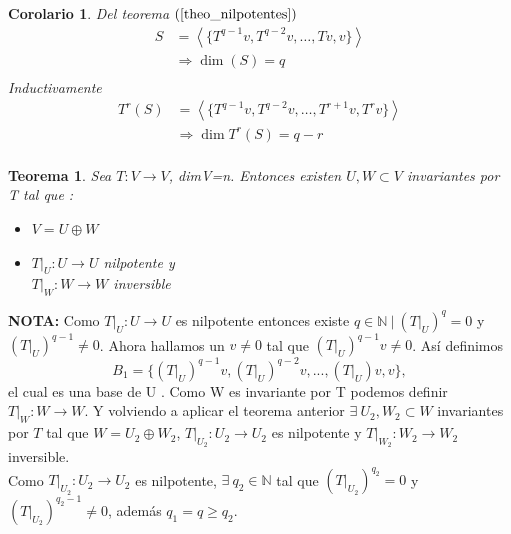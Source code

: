 \documentclass[12pt,a4paper]{article}
\newtheorem{mytheo}{Teorema}[section]
\newtheorem{mycorol}{Corolario}[section]
\begin{document}
\begin{multicols}{2}
	\begin{mycorol}
		Del teorema $(\ref{theo_nilpotentes})$
		\begin{align*}
		S &= \left<\{T^{q-1}v, T^{q-2}v,\ldots,Tv, v\}\right>\\
		&\Rightarrow\dim (S) = q\\			
		\end{align*}
		Inductivamente 
		\begin{align*}
		T^{r}(S) &= \left<\{T^{q-1}v, T^{q-2}v,\ldots,T^{r+1}v, T^{r}v\}\right>\\
		&\Rightarrow\dim T^{r}(S) = q-r\\			
		\end{align*}
	\end{mycorol}
	\begin{mytheo}
		\noindent Sea $T:V\rightarrow V$, dimV=n. Entonces existen $U, W \subset V$ invariantes por T tal que :
		\begin{itemize}
			\item $V=U\oplus W$ 
			\item $T|_{U}:U\rightarrow U$ nilpotente  y\\ $T|_{W}:W\rightarrow W$ inversible
		\end{itemize}
	\end{mytheo}
	\noindent\textbf{NOTA:}
	\noindent Como $T|_{U}:U\rightarrow U$ es nilpotente entonces existe $q\in\mathbb{N} \ | \  \left(T|_{U}\right)^{q}=0 $ y $(T|_{U})^{q-1}\neq 0$. Ahora hallamos un $v\neq0$ tal que $(T|_{U})^{q-1}v\neq 0$. Así definimos 
	$$B_{1}=\{(T|_{U})^{q-1}v, (T|_{U})^{q-2}v, ..., (T|_{U})v,v \},$$ el cual es una base de U . Como W es invariante por T podemos definir $T|_{W}:W\rightarrow W$. Y volviendo a aplicar el teorema anterior $\exists \ U_{2}, W_{2} \subset W$ invariantes por $T$ tal que  $W=U_{2}\oplus W_{2}$,
	$T|_{U_{2}}: U_{2}\rightarrow U_{2}$ es nilpotente y $T|_{W_{2}}:W_{2}\rightarrow W_{2}$ inversible.\\
	Como $T|_{U_{2}}:U_{2}\rightarrow U_{2}$ es nilpotente, $\exists \ q_{2} \in \mathbb{N}$ tal que $ (T|_{U_{2}})^{q_{2}}=0$ y $(T|_{U_{2}})^{q_{2}-1}\neq 0$, además  $q_{1}=q\geq q_{2}.$

\end{multicols}
\end{document}

